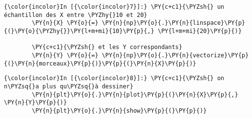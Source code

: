     \begin{Verbatim}[commandchars=\\\{\},frame=single,framerule=0.3mm,rulecolor=\color{cellframecolor}]
{\color{incolor}In [{\color{incolor}7}]:} \PY{c+c1}{\PYZsh{} un échantillon des X entre \PYZhy{}10 et 20}
        \PY{n}{X} \PY{o}{=} \PY{n}{np}\PY{o}{.}\PY{n}{linspace}\PY{p}{(}\PY{o}{\PYZhy{}}\PY{l+m+mi}{10}\PY{p}{,} \PY{l+m+mi}{20}\PY{p}{)}
        
        \PY{c+c1}{\PYZsh{} et les Y correspondants}
        \PY{n}{Y} \PY{o}{=} \PY{n}{np}\PY{o}{.}\PY{n}{vectorize}\PY{p}{(}\PY{n}{morceaux}\PY{p}{)}\PY{p}{(}\PY{n}{X}\PY{p}{)}
\end{Verbatim}


    \begin{Verbatim}[commandchars=\\\{\},frame=single,framerule=0.3mm,rulecolor=\color{cellframecolor}]
{\color{incolor}In [{\color{incolor}8}]:} \PY{c+c1}{\PYZsh{} on n\PYZsq{}a plus qu\PYZsq{}à dessiner}
        \PY{n}{plt}\PY{o}{.}\PY{n}{plot}\PY{p}{(}\PY{n}{X}\PY{p}{,} \PY{n}{Y}\PY{p}{)}
        \PY{n}{plt}\PY{o}{.}\PY{n}{show}\PY{p}{(}\PY{p}{)}
\end{Verbatim}


    \begin{center}
    \end{center}
    { \hspace*{\fill} \\}
    

    
    
    
